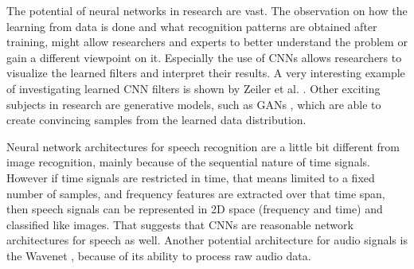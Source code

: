 The potential of neural networks in research are vast.
The observation on how the learning from data is done and what recognition patterns are obtained after training, might allow researchers and experts to better understand the problem or gain a different viewpoint on it.
Especially the use of CNNs allows researchers to visualize the learned filters and interpret their results.
A very interesting example of investigating learned CNN filters is shown by Zeiler et al. \cite{Zeiler2013}.
Other exciting subjects in research are generative models, such as GANs \cite{Goodfellow2014}, which are able to create convincing samples from the learned data distribution.

Neural network architectures for speech recognition are a little bit different from image recognition, mainly because of the sequential nature of time signals.
However if time signals are restricted in time, that means limited to a fixed number of samples, and frequency features are extracted over that time span, then speech signals can be represented in 2D space (frequency and time) and classified like images.
That suggests that CNNs are reasonable network architectures for speech as well.
Another potential architecture for audio signals is the Wavenet \cite{Oord2016}, because of its ability to process raw audio data.